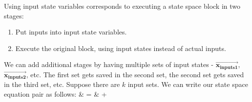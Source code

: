 
    Using input state variables corresponds to executing a state space
block in two stages:
\begin{enumerate}
\vspace{\itemshrink} \item Put inputs into input state variables.

\vspace{\itemshrink} \item Execute the original block, using input states instead of
actual inputs.
\vspace{\itemshrink} \end{enumerate}

    We can add additional stages by having multiple sets of input
states - $\vec{\mathbf{x_{inputs1}}}$,
$\vec{\mathbf{x_{inputs2}}}$, etc. The first set gets saved in the
second set, the second set gets saved in the third set, etc.
Suppose there are $k$ input sets. We can write our state space
equation pair as follows:
\starteqnstar
{} & = &  
+ 
